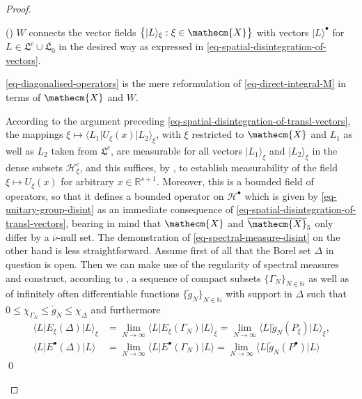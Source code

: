 \documentclass[11pt,twoside,openright]{report}
\theoremstyle{definition}
\theoremstyle{plain}
\theoremstyle{remark}
\theoremstyle{assumption}
\newcommand{\bset}[1]{\bigl\{ #1 \bigr\}}
\newcommand{\bullket}[1]{\vert #1 \rangle^\bullet}
\newcommand{\xiket}[1]{\vert #1 \rangle_\xi}
\newcommand{\bscpx}[3]{\bigl\langle #1 \big\vert #2 \big\vert #3
  \bigr\rangle}
\newcommand{\xiscpx}[3]{\langle #1 \vert #2 \vert #3 \rangle_\xi}
\newcommand{\bxiscpx}[3]{\bigl\langle #1 \big\vert #2 \big\vert #3
  \bigr\rangle_\xi}
\newcommand{\Nbb}{\mathbb{N}}
\newcommand{\Xecm}{\mathecm{X}}
\newcommand{\Hscr}{\mathscr{H}}
\newcommand{\Rsone}{\mathbb{R}^{s + 1}}
\newcommand{\Xecmbar}{\overline{\mathecm{X}}}
\newcommand{\nubar}{\overline{\nu}}
\newcommand{\EbulletDelta}{E^\bullet ( \Delta )}
\newcommand{\EbulletGammaN}{E^\bullet ( \Gamma_N )}
\newcommand{\ExiDelta}{E_\xi ( \Delta )}
\newcommand{\ExiGammaN}{E_\xi ( \Gamma_N )}
\newcommand{\idealcount}{\mathfrak{L}^c}
\newcommand{\vacbar}{\overline{\mathfrak{L}_0}}
\newcommand{\Hbullet}{\mathscr{H}^\bullet}
\newcounter{proofitem}
\newenvironment{prooflist}{\begin{list}{(\roman{proofitem})}%
  {\usecounter{proofitem} \setlength{\topsep}{0ex}%
   \setlength{\parsep}{0.2ex} \setlength{\itemsep}{0.4ex}%
   \setlength{\leftmargin}{0em} \setlength{\itemindent}{0.5em}%
   \setlength{\listparindent}{1em}}}{\qed \end{list}}
\begin{document}
\begin{proof}
\begin{prooflist}
    $W$ connects the vector fields $\bset{\xiket{L} : \xi \in \Xecm}$
    with vectors $\bullket{L}$ for $L \in \idealcount \cup \vacbar$ in
    the desired way as expressed in
    \eqref{eq-spatial-disintegration-of-vectors}.
  \item \eqref{eq-diagonalised-operators} is the mere reformulation of
    \eqref{eq-direct-integral-M} in terms of $\Xecm$ and $W$.
  \item According to the argument preceding
    \eqref{eq-spatial-disintegration-of-transl-vectors}, the mappings
    $\xi \mapsto \xiscpx{L_1}{U_\xi ( x )}{L_2}$, with $\xi$
    restricted to $\Xecm$ and $L_1$ as well as $L_2$ taken from
    $\idealcount$, are measurable for all vectors $\xiket{L_1}$ and
    $\xiket{L_2}$ in the dense subsets $\Hscr_\xi^c$, and this
    suffices, by \cite[Section~II.2.1, Proposition~1]{dixmier:1981},
    to establish measurability of the field $\xi \mapsto U_\xi ( x )$
    for arbitrary $x \in \Rsone$. Moreover, this is a bounded field of
    operators, so that it defines a bounded operator on $\Hbullet$
    which is given by \eqref{eq-unitary-group-disint} as an immediate
    consequence of
    \eqref{eq-spatial-disintegration-of-transl-vectors}, bearing in
    mind that $\Xecm$ and $\Xecmbar_5$ only differ by a $\nubar$-null
    set. The demonstration of \eqref{eq-spectral-measure-disint} on
    the other hand is less straightforward. Assume first of all that
    the Borel set $\Delta$ in question is open. Then we can make use
    of the regularity of spectral measures and construct, according to
    \cite[Definition~II.8.2]{fell/doran:1988a}, a sequence of compact
    subsets $\bset{\Gamma_N}_{N \in \Nbb}$ as well as of infinitely
    often differentiable functions $\bset{\tilde{g}_N}_{N \in \Nbb}$
    with support in $\Delta$ such that $0 \leqslant \chi_{\Gamma_N}
    \leqslant \tilde{g}_N \leqslant \chi_\Delta$ and furthermore
    \begin{subequations}
      \begin{align}
        \label{eq-Exi-approximation}
        \bxiscpx{L}{\ExiDelta}{L} & = \lim_{N \rightarrow \infty}
        \bxiscpx{L}{\ExiGammaN}{L} = \lim_{N \rightarrow \infty}
        \bxiscpx{L}{\tilde{g}_N ( P_\xi )}{L} \text{,} \\
        \label{eq-Ebullet-approximation}
        \bscpx{L}{\EbulletDelta}{L} & = \lim_{N \rightarrow \infty}
        \bscpx{L}{\EbulletGammaN}{L} = \lim_{N \rightarrow \infty}
        \bscpx{L}{\tilde{g}_N ( P^\bullet )}{L}
      \end{align}

\end{subequations}
\end{prooflist}
\end{proof}
\end{document}
